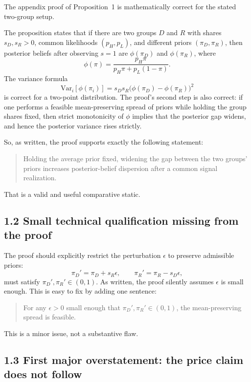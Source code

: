 \documentclass[11pt]{article}
\begin{document}
The appendix proof of Proposition~1 is mathematically correct for the stated two-group setup.

The proposition states that if there are two groups $D$ and $R$ with shares $s_D,s_R>0$, common likelihoods $(p_H,p_L)$, and different priors $(\pi_D,\pi_R)$, then posterior beliefs after observing $s=1$ are $\phi(\pi_D)$ and $\phi(\pi_R)$, where
\[
\phi(\pi)=\frac{p_H\pi}{p_H\pi+p_L(1-\pi)}.
\]
The variance formula
\[
\mathrm{Var}_i[\phi(\pi_i)] = s_D s_R \bigl(\phi(\pi_D)-\phi(\pi_R)\bigr)^2
\]
is correct for a two-point distribution. The proof's second step is also correct: if one performs a feasible mean-preserving spread of priors while holding the group shares fixed, then strict monotonicity of $\phi$ implies that the posterior gap widens, and hence the posterior variance rises strictly.

So, as written, the proof supports exactly the following statement:

\begin{quote}
Holding the average prior fixed, widening the gap between the two groups' priors increases posterior-belief dispersion after a common signal realization.
\end{quote}

That is a valid and useful comparative static.

\subsection*{1.2 Small technical qualification missing from the proof}

The proof should explicitly restrict the perturbation $\epsilon$ to preserve admissible priors:
\[
\pi_D'=\pi_D+s_R\epsilon,\qquad \pi_R'=\pi_R-s_D\epsilon,
\]
must satisfy $\pi_D',\pi_R'\in(0,1)$. As written, the proof silently assumes $\epsilon$ is small enough. This is easy to fix by adding one sentence:

\begin{quote}
For any $\epsilon>0$ small enough that $\pi_D',\pi_R'\in(0,1)$, the mean-preserving spread is feasible.
\end{quote}

This is a minor issue, not a substantive flaw.

\subsection*{1.3 First major overstatement: the price claim does not follow}
\end{document}
